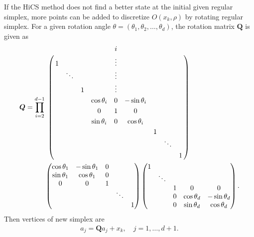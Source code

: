 If the HiCS method does not find a better state at the initial given regular
simplex, more points can be added to discretize $O(x_k, \rho)$ by 
rotating regular simplex.
For a given rotation angle
$\theta=(\theta_1,\theta_2,\dots,\theta_{d})$, the
rotation matrix $\bm Q$ is given as 
\begin{equation}
\begin{aligned}
	{\bm Q} = 
	 \prod_{i=2}^{d-1} &
\bordermatrix{
  &  &       &  & 		   & i &		   &  &  & \cr
  & 1&       &  & 		   & \vdots  & 		   &  &  &  \cr
  &  & \ddots&  & 		   & \vdots  & 		   &  &  &  \cr
  &  &       & 1&          & \vdots  & 		   &  &  &  \cr
  &  &       &  & \cos \theta_i & 0 & -\sin \theta_i &  &  &  \cr
  &  &       &  &   0	 & 1 &     0     &  &  & \cr 
  &  &       &  & \sin \theta_i & 0 &  \cos \theta_i &  &  &  \cr
  &  &       &  &          &   &           & 1 & &  \cr
  &  &       &  &          &   &           &  & \ddots &   \cr
  &  &       &  &          &   &           &  &  & 1 
}
\\
	& \begin{pmatrix}
  \cos \theta_1 & -\sin \theta_1 & 0 &  		&   \\
  \sin \theta_1 & \cos \theta_1  & 0 & 	 	& 	\\
  	0	   &      0    & 1 & 		&   \\
  		   & 		   &   & \ddots &   \\
  		   & 		   &   &   		& 1 
	\end{pmatrix}
	\begin{pmatrix}
  1 &  &  &  		&   \\
    & \ddots  &  & 	 	& 	\\
    &    & 1 & 	0	& 0  \\
    &    & 0 & \cos\theta_d & -\sin\theta_d  \\
    & 	 & 0 &  \sin\theta_d & \cos\theta_d 
	\end{pmatrix}.
\end{aligned}
	\label{}
\end{equation}
Then vertices of new simplex are
\begin{align}
	a_j = \bm{Q}a_j + x_k, \quad j = 1,\dots, d+1.
	\label{}
\end{align}
